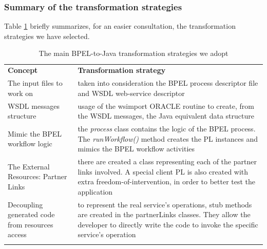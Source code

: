 \subsubsection{Summary of the transformation strategies}
\label{transfStrategySummary}
Table \ref{tab:transStrategies} briefly summarizes, for an easier consultation, the transformation strategies we have selected. 
\begin{table}
\caption{The main BPEL-to-Java transformation strategies we adopt}
\label{tab:transStrategies}
\begin{center}
\begin{tabular}{p{5cm} p{}}
						\toprule
						\addlinespace[0.2cm]
\textbf{Concept} 	& \textbf{Transformation strategy} 	\\ 
						\cmidrule(l){1-2}
The input files to work on 	& taken into consideration the BPEL process descriptor file and WSDL web-service descriptor 			 			\\[0,5cm]
WSDL messages structure 			&  usage of the wsimport ORACLE routine to create, from the WSDL messages, the Java equivalent data structure  			\\[0,5cm]
Mimic the BPEL workflow logic 			& the \textit{process} class contains the logic of the BPEL process. The \textit{runWorkflow()} method creates the PL instances and mimics the BPEL workflow activities  					\\[0,5cm]
The External Resources: Partner Links 		&  there are created a class representing each of the partner links involved. A special client PL is also created with extra freedom-of-intervention, in order to better test the application		\\[0,5cm]
Decoupling generated code from resources access & to represent the real service's operations, stub methods are created in the partnerLinks classes. They allow the developer to directly write the code to invoke the specific service's operation		 	\\[0,5cm]
\addlinespace[0.2cm]
						\bottomrule
\end{tabular}
\end{center}
\end{table}
